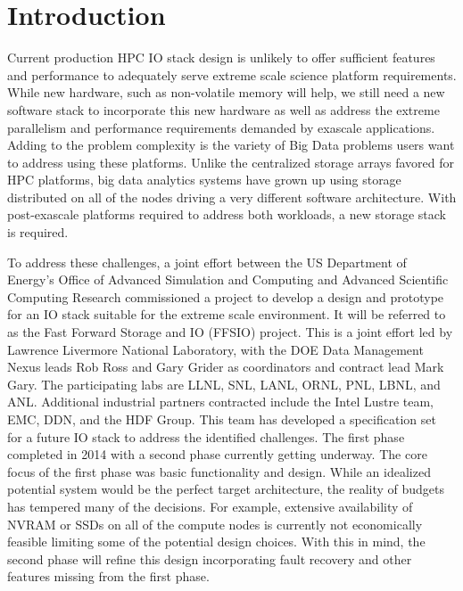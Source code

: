 \documentclass[conference]{IEEEtran} \pdfpagewidth=8.5in
\begin{document}

\section{Introduction}

Current production HPC IO stack design is unlikely to offer sufficient features
and performance to adequately serve extreme scale science platform
requirements.  While new hardware, such as non-volatile memory will help, we
still need a new software stack to incorporate this new hardware as well as
address the extreme parallelism and performance requirements demanded by
exascale applications. Adding to the problem complexity is the variety of Big
Data problems users want to address using these platforms. Unlike the
centralized storage arrays favored for HPC platforms, big data analytics
systems have grown up using storage distributed on all of the nodes driving a
very different software architecture. With post-exascale platforms required to
address both workloads, a new storage stack is required.

To address these challenges, a joint effort between the US Department of
Energy's Office of Advanced Simulation and Computing and Advanced Scientific
Computing Research commissioned a project to develop a design and prototype for
an IO stack suitable for the extreme scale environment. It will be referred to
as the Fast Forward Storage and IO (FFSIO) project. This is a joint effort led
by Lawrence Livermore National Laboratory, with the DOE Data Management Nexus
leads Rob Ross and Gary Grider as coordinators and contract lead Mark Gary. The
participating labs are LLNL, SNL, LANL, ORNL, PNL, LBNL, and ANL.  Additional
industrial partners contracted include the Intel Lustre team, EMC, DDN, and the
HDF Group. This team has developed a specification
set~\cite{fastforward:2014:docs} for a future IO stack to address the
identified challenges. The first phase completed in 2014 with a second phase
currently getting underway. The core focus of the first phase was basic
functionality and design. While an idealized potential system would be the
perfect target architecture, the reality of budgets has tempered many of the
decisions. For example, extensive availability of NVRAM or SSDs on all of the
compute nodes is currently not economically feasible limiting some of the
potential design choices.  With this in mind, the second phase will refine this
design incorporating fault recovery and other features missing from the first
phase.
\end{document}
